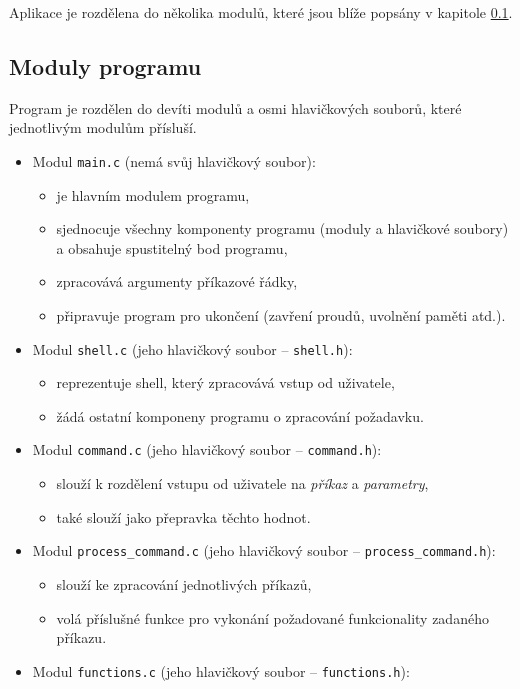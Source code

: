 \documentclass[
11pt,
a4paper,
pdftex,
czech,
titlepage
]{report}
\begin{document}
Aplikace je rozdělena do několika modulů, které jsou blíže popsány v kapitole \ref{moduls}.

\subsection{Moduly programu}\label{moduls}
Program je rozdělen do devíti modulů a osmi hlavičkových souborů, které jednotlivým modulům přísluší.

\begin{itemize}
\item Modul \texttt{main.c} (nemá svůj hlavičkový soubor):
	\begin{itemize}
	\item je hlavním modulem programu,
	\item sjednocuje všechny komponenty programu (moduly a hlavičkové soubory) a obsahuje spustitelný bod programu,
	\item zpracovává argumenty příkazové řádky,
	\item připravuje program pro ukončení (zavření proudů, uvolnění paměti atd.).
	\end{itemize}
\item Modul \texttt{shell.c} (jeho hlavičkový soubor -- \texttt{shell.h}):
	\begin{itemize}
	\item reprezentuje shell, který zpracovává vstup od uživatele,
	\item žádá ostatní komponeny programu o zpracování požadavku.
	\end{itemize}
\item Modul \texttt{command.c} (jeho hlavičkový soubor -- \texttt{command.h}):
	\begin{itemize}
	\item slouží k rozdělení vstupu od uživatele na \textit{příkaz} a \textit{parametry},
	\item také slouží jako přepravka těchto hodnot.
	\end{itemize}
\item Modul \texttt{process\_command.c} (jeho hlavičkový soubor -- \texttt{process\_command.h}):
	\begin{itemize}
	\item slouží ke zpracování jednotlivých příkazů,
	\item volá příslušné funkce pro vykonání požadované funkcionality zadaného příkazu.
	\end{itemize}
\item Modul \texttt{functions.c} (jeho hlavičkový soubor -- \texttt{functions.h}):

\end{itemize}
\end{document}
